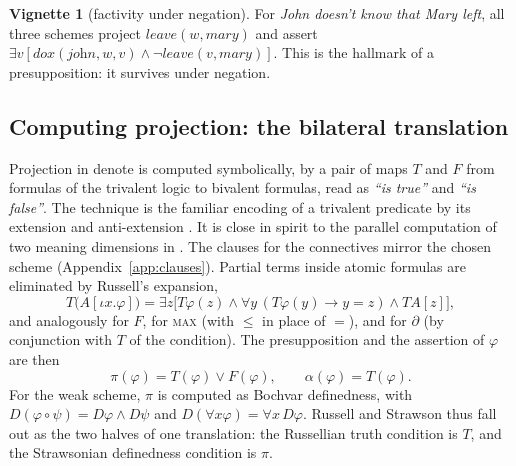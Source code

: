 \documentclass[11pt,a4paper]{article}
\newcommand{\dn}{\textsf{denote}}
\theoremstyle{definition}
\newtheorem{vignette}{Vignette}
\begin{document}
\begin{vignette}[factivity under negation]\label{v:factive}
For \textit{John doesn't know that Mary left}, all three schemes project $\textit{leave}(w,\textit{mary})$ and assert $\exists v[\textit{dox}(\textit{john},w,v)\wedge\neg\textit{leave}(v,\textit{mary})]$. This is the hallmark of a presupposition: it survives under negation.
\end{vignette}

\subsection{Computing projection: the bilateral translation}
Projection in \dn{} is computed symbolically, by a pair of maps $T$ and $F$ from formulas of the trivalent logic to bivalent formulas, read as \emph{``is true''} and \emph{``is false''}. The technique is the familiar encoding of a trivalent predicate by its extension and anti-extension \citep{kripke1975}. It is close in spirit to the parallel computation of two meaning dimensions in \citet{karttunenpeters1979}. The clauses for the connectives mirror the chosen scheme (Appendix~\ref{app:clauses}). Partial terms inside atomic formulas are eliminated by Russell's expansion,
\begin{equation}\label{eq:russell}
T\big(A[\iota x.\varphi]\big)=\exists z\big[T\varphi(z)\wedge\forall y\,(T\varphi(y)\to y=z)\wedge T A[z]\big],
\end{equation}
and analogously for $F$, for \textsc{max} (with $\leq$ in place of $=$), and for $\partial$ (by conjunction with $T$ of the condition). The presupposition and the assertion of $\varphi$ are then
\begin{equation}
\pi(\varphi)=T(\varphi)\vee F(\varphi),\qquad\alpha(\varphi)=T(\varphi).
\end{equation}
For the weak scheme, $\pi$ is computed as Bochvar definedness, with $D(\varphi\circ\psi)=D\varphi\wedge D\psi$ and $D(\forall x\varphi)=\forall x\,D\varphi$. Russell and Strawson thus fall out as the two halves of one translation: the Russellian truth condition is $T$, and the Strawsonian definedness condition is $\pi$.
\end{document}

